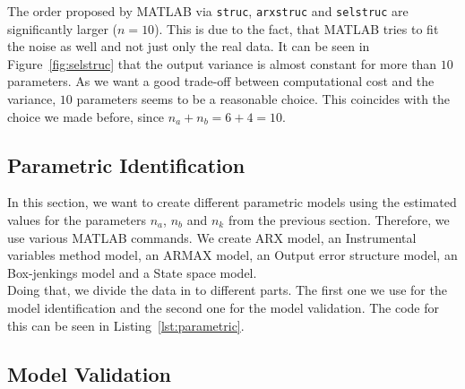 \documentclass{scrartcl}
\newcommand*{\matlabcode}[3]{\begin{figure}[h!]\end{figure}}
\begin{document}
The order proposed by MATLAB via \texttt{struc}, \texttt{arxstruc} and \texttt{selstruc} are significantly larger ($n = 10$). This is due to the fact, that MATLAB tries to fit the noise as well and not just only the real data. It can be seen in Figure~\ref{fig:selstruc} that the output variance is almost constant for more than $10$ parameters. As we want a good trade-off between computational cost and the variance, $10$ parameters seems to be a reasonable choice. This coincides with the choice we made before, since $n_a + n_b = 6 + 4 = 10$. 

\newpage
\subsection{Parametric Identification}

In this section, we want to create different parametric models using the estimated values for the parameters $n_a$, $n_b$ and $n_k$ from the previous section. Therefore, we use various MATLAB commands. We create ARX model, an Instrumental variables method model, an ARMAX model, an Output error structure model, an  Box-jenkings model and a State space model.\\
Doing that, we divide the data in to different parts. The first one we use for the model identification and the second one for the model validation. 
The code for this can be seen in Listing~\ref{lst:parametric}.  

\matlabcode{../matlab/ce2/parametric_identification.m}{Code for partitioning the data and creating the models}{lst:parametric}

\subsection{Model Validation}
\end{document}
